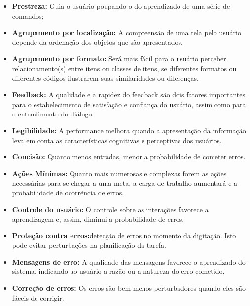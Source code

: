 	\begin{itemize}
		\item \textbf{Prestreza:} Guia o usuário poupando-o do aprendizado de uma série de comandos;
		
    	\item \textbf{Agrupamento por localização:} A compreensão de uma tela pelo usuário depende da ordenação dos objetos que são apresentados. 
    	
    	\item \textbf{Agrupamento por formato:} Será mais fácil para o usuário perceber relacionamento(s) entre itens ou classes de itens, se diferentes formatos ou diferentes códigos ilustrarem suas similaridades ou diferenças.

	    \item \textbf{Feedback:} A qualidade e a rapidez do feedback são dois fatores importantes para o estabelecimento de satisfação e confiança do usuário, assim como para o entendimento do diálogo.

		\item \textbf{Legibilidade:} A performance melhora quando a apresentação da informação leva em conta as características cognitivas e perceptivas dos usuários. 
     	
     	\item \textbf{Concisão:} Quanto menos entradas, menor a probabilidade de cometer erros. 

		\item \textbf{Ações Mínimas:} Quanto mais numerosas e complexas forem as ações necessárias para se chegar a uma meta, a carga de trabalho aumentará e  a probabilidade de ocorrência de erros.

		\item \textbf{Controle do usuário:}	O controle sobre as interações favorece a aprendizagem e, assim, diminui a probabilidade de erros. 

		\item \textbf{Proteção contra erros:}detecção de erros no momento da digitação. Isto pode evitar perturbações na planificação da tarefa.

   		\item \textbf{Mensagens de erro:} A qualidade das mensagens favorece o aprendizado do sistema, indicando ao usuário a razão ou a natureza do erro cometido.

    	\item \textbf{Correção de erros:} Os erros são bem menos perturbadores quando eles são fáceis de corrigir.

		
	\end{itemize}

